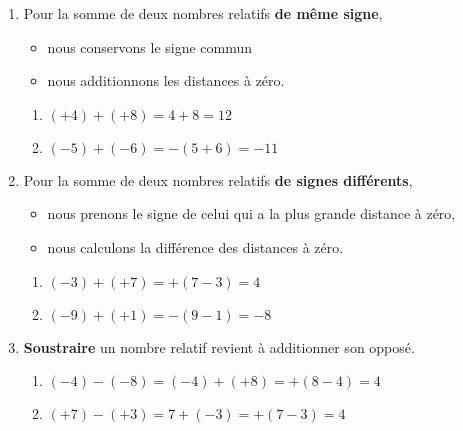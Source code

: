 \begin{propriete}
    \begin{enumerate}
        \item
            
    Pour la somme de deux nombres relatifs {\bf de même signe},
    \begin{itemize}
        \item
            nous conservons le signe commun
        \item
            nous additionnons les distances à zéro.
    \end{itemize}


    \begin{example}
        \begin{enumerate}
            \item
                
        \( (+4)+(+8)=4+8=12\)
    \item
        \( (-5)+(-6)=-(5+6)=-11\)
        \end{enumerate}
    \end{example}

\item
    Pour la somme de deux nombres relatifs {\bf de signes différents},
    \begin{itemize}
        \item
            nous prenons le signe de celui qui a la plus grande distance à zéro,
        \item
            nous calculons la différence des distances à zéro.
    \end{itemize}

    \begin{example}
        \begin{enumerate}
            \item
                \( (-3)+(+7)=+(7-3)=4\)
            \item
                \( (-9)+(+1)=-(9-1)=-8\)
        \end{enumerate}
    \end{example}
\item
    {\bf Soustraire} un nombre relatif revient à additionner son opposé.

    \begin{example}
        \begin{enumerate}
            \item
                \( (-4)-(-8)=(-4)+(+8)=+(8-4)=4\)
            \item
                \( (+7)-(+3)=7+(-3)=+(7-3)=4\)
        \end{enumerate}
    \end{example}

    \end{enumerate}
\end{propriete}

